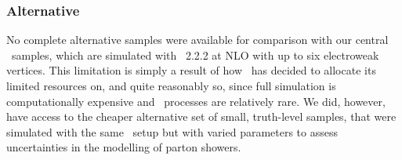\subsubsection{Alternative \diboson}
\label{sec:2ljets_diboson_alt}
No complete alternative samples were available for comparison with our central
\diboson\ samples, which are simulated with \sherpa~2.2.2 at NLO with up to six
electroweak vertices.
This limitation is simply a result of how \atlas\ has decided to allocate
its limited resources on, and quite reasonably so, since full simulation is
computationally expensive and \diboson\ processes are relatively rare.
We did, however, have access to the cheaper alternative set of small,
truth-level samples, that were simulated with the same \sherpa\ setup but with
varied parameters to assess uncertainties in the modelling of parton showers.

